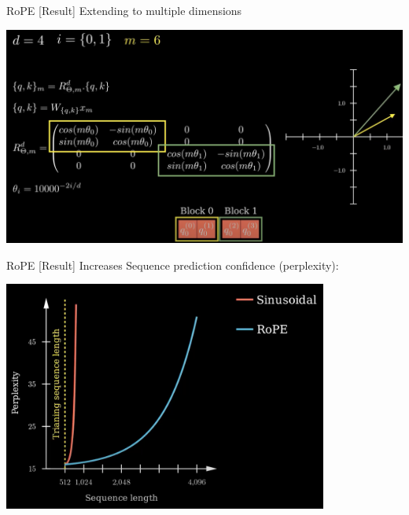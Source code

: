 \documentclass{beamer}
\begin{document}
\begin{frame}[t]{RoPE [Result]}
    Extending to multiple dimensions
    \begin{center}
        \includegraphics[width=1.0\textwidth]{./img/rope_4.png}
    \end{center}
\end{frame}

\begin{frame}[t]{RoPE [Result]}
    Increases Sequence prediction confidence (perplexity):
    \begin{center}
        \includegraphics[width=0.8\textwidth]{./img/rope_5.png}
    \end{center}
\end{frame}
\end{document}
